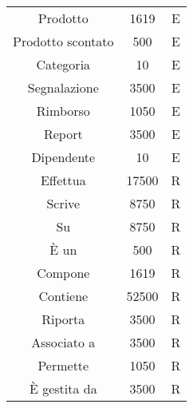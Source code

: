 \begin{center}
\begin{tabular}{ |c|c|c|}
\multirow{2}{6em}{Prodotto} & \multirow{2}{2em}{1619} & \multirow{2}{12em}{E}\\
 & &\\
\hline 
\multirow{2}{6em}{Prodotto scontato} & \multirow{2}{2em}{500} & \multirow{2}{12em}{E}\\
 & &\\
\hline 
\multirow{2}{6em}{Categoria} & \multirow{2}{2em}{10} & \multirow{2}{12em}{E}\\
 & &\\
\hline
\multirow{2}{6em}{Segnalazione} & \multirow{2}{2em}{3500} & \multirow{2}{12em}{E}\\
 & &\\
 \hline
\multirow{2}{6em}{Rimborso} & \multirow{2}{2em}{1050} & \multirow{2}{12em}{E}\\
 & &\\
 \hline
\multirow{2}{6em}{Report} & \multirow{2}{2em}{3500} & \multirow{2}{12em}{E}\\
 & &\\
 \hline
\multirow{2}{6em}{Dipendente} & \multirow{2}{2em}{10} & \multirow{2}{12em}{E}\\
 & &\\
\hline
\multirow{2}{6em}{Effettua} & \multirow{2}{2em}{17500} & \multirow{2}{12em}{R}\\
 & &\\
\hline
\multirow{2}{6em}{Scrive} & \multirow{2}{2em}{8750} & \multirow{2}{12em}{R}\\
 & &\\
\hline
\multirow{2}{6em}{Su} & \multirow{2}{2em}{8750} & \multirow{2}{12em}{R}\\
 & &\\
\hline
\multirow{2}{6em}{È un} & \multirow{2}{2em}{500} & \multirow{2}{12em}{R}\\
 & &\\
\hline
\multirow{2}{6em}{Compone} & \multirow{2}{2em}{1619} & \multirow{2}{12em}{R}\\
 & &\\
\hline
\multirow{2}{6em}{Contiene} & \multirow{2}{2em}{52500} & \multirow{2}{12em}{R}\\
 & &\\
\hline
\multirow{2}{6em}{Riporta} & \multirow{2}{2em}{3500} & \multirow{2}{12em}{R}\\
 & &\\
\hline
\multirow{2}{6em}{Associato a} & \multirow{2}{2em}{3500} & \multirow{2}{12em}{R}\\
 & &\\
\hline
\multirow{2}{6em}{Permette} & \multirow{2}{2em}{1050} & \multirow{2}{12em}{R}\\
 & &\\
\hline
\multirow{2}{6em}{È gestita da} & \multirow{2}{2em}{3500} & \multirow{2}{12em}{R}\\
 & &\\
\hline
\end{tabular}
\end{center}